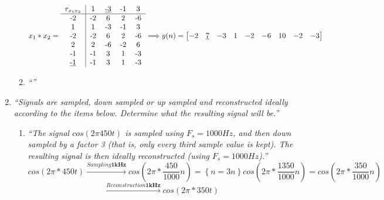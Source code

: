 \documentclass{article}
\begin{document}
\begin{enumerate}
\begin{enumerate}
                \begin{displaymath}
                    x_1*x_2 =
                    \begin{tabular}{c|cccc}
                        $r_{x_1x_2}$    &   1   &   \underline{-3}  &   -1  &   3   \\
                        \hline
                        -2              &   -2  &   6               &   2   &   -6  \\  
                        1               &   1   &   -3              &   -1  &   3   \\
                        -2              &   -2  &   6               &   2   &   -6  \\  
                        2               &   2   &   -6              &   -2  &   6   \\
                        -1              &   -1  &   3               &   1   &   -3  \\
                        \underline{-1}  &   -1  &   3               &   1   &   -3  \\
                    \end{tabular}
                    \Longrightarrow
                    y(n)=
                    \begin{bmatrix}
                        -2 & \underline{7} & -3 & 1 & -2 & -6 & 10 & -2 & -3 
                    \end{bmatrix}
                \end{displaymath}

            \item %
                \emph{``''}
                \\
        \end{enumerate}

    \item %
        \emph{``Signals are sampled, down sampled or up sampled and reconstructed ideally according to the items below. Determine what the resulting signal will be.''}
        \begin{enumerate}
            \item %
                \emph{``The signal $cos(2\pi450t)$ is sampled using $F_s = 1000Hz$, and then down sampled by a
                        factor 3 (that is, only every third sample value is kept). The resulting signal is then
                        ideally reconstructed (using $F_s = 1000 Hz$).''}
                \\
                \begin{displaymath}
                    cos(2\pi*450t) \xrightarrow[]{Sampling \textbf{1kHz}} cos(2\pi*\frac{450}{1000}n) = 
                    \left\{ n=3n \right\} cos(2\pi*\frac{1350}{1000}n) = cos(2\pi*\frac{350}{1000}n)
                \end{displaymath}
                \begin{displaymath}
                    \xrightarrow[]{Reconstruction \textbf{1kHz}} cos(2\pi*350t) 
                \end{displaymath}


\end{enumerate}
\end{enumerate}
\end{document}
